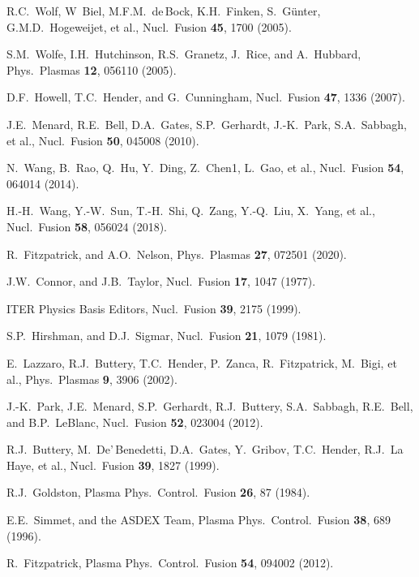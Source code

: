 \documentclass[12pt,prb,aps]{revtex4-1}
\begin{document}
\begin{thebibliography}{99}
 R.C.~Wolf, W~Biel, M.F.M.~de\,Bock, K.H.~Finken, S.~G\"{u}nter, G.M.D.~Hogeweijet, et al., Nucl.\ Fusion {\bf 45}, 1700 (2005).

 S.M.~Wolfe,  I.H.~Hutchinson, R.S.~Granetz, J.~Rice, and A.~Hubbard, Phys.\ Plasmas {\bf 12}, 056110 (2005).

 D.F.~Howell, T.C.~Hender, and G.~Cunningham, Nucl.\ Fusion {\bf 47}, 1336 (2007).

 J.E.~Menard, R.E.~Bell, D.A.~Gates, S.P.~Gerhardt, J.-K.~Park, S.A.~Sabbagh, et al., Nucl.\ Fusion {\bf 50}, 045008 (2010).

 N.~Wang, B.~Rao, Q.~Hu, Y.~Ding, Z.~Chen1, L.~Gao, et al., Nucl.\ Fusion {\bf 54}, 064014 (2014).

 H.-H.~Wang, Y.-W.~Sun, T.-H.~Shi, Q.~Zang, Y.-Q.~Liu, X.~Yang, et al., Nucl.\ Fusion {\bf 58}, 056024 (2018).

 R.~Fitzpatrick, and A.O.~Nelson,  Phys.\ Plasmas {\bf 27}, 072501 (2020).

 J.W.~Connor, and J.B.~Taylor, Nucl.\ Fusion {\bf 17}, 1047 (1977).

 ITER Physics Basis Editors, Nucl.\ Fusion {\bf 39}, 2175 (1999). 

 S.P.~Hirshman, and D.J.~Sigmar, Nucl.\ Fusion {\bf 21}, 1079 (1981). 

 E.~Lazzaro, R.J.~Buttery, T.C.~Hender, P.~Zanca, R.~Fitzpatrick, 
M.~Bigi, et al., Phys.\ Plasmas {\bf 9}, 3906 (2002).

 J.-K.~Park, J.E.~Menard, S.P.~Gerhardt, R.J.~Buttery, S.A.~Sabbagh, R.E.~Bell, and B.P.~LeBlanc, Nucl.\ Fusion {\bf 52}, 023004 (2012).

 R.J.~Buttery, M.~De'\,Benedetti, D.A.~Gates, Y.~Gribov, T.C.~Hender, R.J.~La\,Haye, et al., Nucl.\ Fusion {\bf 39}, 1827 (1999).

 R.J.~Goldston, Plasma Phys.\ Control.\ Fusion {\bf 26}, 87 (1984).

 E.E.~Simmet, and the ASDEX Team, Plasma Phys.\ Control.\ Fusion {\bf 38}, 689 (1996).

 R.~Fitzpatrick, Plasma Phys.\ Control.\ Fusion {\bf 54}, 094002 (2012).

\end{thebibliography}
\end{document}
